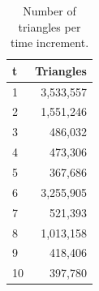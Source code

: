 \begin{table}[t]
\centering
\caption{Number of triangles per time increment.}
\label{tab:triangles}
\begin{tabular}{lr}
\toprule
t & Triangles \\
\midrule
1 & 3,533,557 \\
2 & 1,551,246 \\
3 & 486,032 \\
4 & 473,306 \\
5 & 367,686 \\
6 & 3,255,905 \\
7 & 521,393 \\
8 & 1,013,158 \\
9 & 418,406 \\
10 & 397,780 \\
\bottomrule
\end{tabular}
\end{table}
